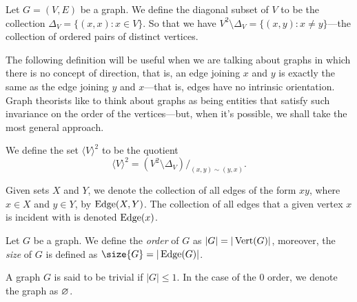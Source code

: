 \begin{definition}
Let \(G = (V, E)\) be a graph. We define the diagonal subset of \(V\) to be
the collection \(\Delta_V = \{(x, x) \colon x \in V\}\). So that we have
\(V^2 \setminus \Delta_V = \{(x, y) \colon x \neq y\}\)---the collection of
ordered pairs of distinct vertices.
\end{definition}

The following definition will be useful when we are talking about graphs in
which there is no concept of direction, that is, an edge joining \(x\) and \(y\)
is exactly the same as the edge joining \(y\) and \(x\)---that is, edges have
no intrinsic orientation. Graph theorists like to think about graphs as being
entities that satisfy such invariance on the order of the vertices---but, when
it's possible, we shall take the most general approach.

\begin{definition}
We define the set \(\langle V \rangle^2\) to be the quotient
\[
  \langle V \rangle^2 = (V^2 \setminus \Delta_V)/_{(x, y) \sim (y, x)}.
\]
\end{definition}

\begin{notation}
Given sets \(X\) and \(Y\), we denote the collection of all edges of the form
\(xy\), where \(x \in X\) and \(y \in Y\), by \(\operatorname{Edge}(X, Y)\). The collection of
all edges that a given vertex \(x\) is incident with is denoted \(\operatorname{Edge}(x)\).
\end{notation}

\begin{definition}\label{def:graph-order-size}
Let \(G\) be a graph. We define the \emph{order} of \(G\) as
\(|G| =|\operatorname{Vert}(G)|\), moreover, the \emph{size} of \(G\) is defined as
\(\size{G} = |\Edge(G)|\).
\end{definition}

\begin{definition}
A graph \(G\) is said to be trivial if \(|G| \leq 1\). In the case of the
\(0\) order, we denote the graph as \(\varnothing\).
\end{definition}
